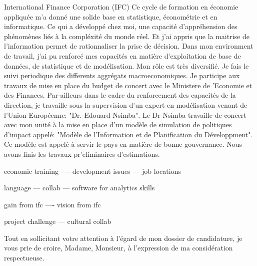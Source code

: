 \documentclass[12pt]{lettre}
\begin{document}
\begin{letter}{
International Finance Corporation (IFC)
}
Ce cycle de formation en \'{e}conomie appliqu\'{e}e m'a donn\'{e} une solide
base en statistique, \'{e}conom\'{e}trie et en informatique. 
Ce qui a d\'{e}velopp\'{e} chez moi, une capacit\'{e} d'appr\'{e}hension 
des ph\'{e}nom\`{e}nes li\'{e}s \`{a} la compl\'{e}xit\'{e} du monde r\'{e}el.
Et j'ai appris que la maitrise de l'information permet de rationnaliser la prise de d\'{e}cision. 
Dans mon environment de travail, j'ai pu renforc\'{e} mes capacit\'{e}s 
en mati\`{e}re d'exploitation de base de donn\'{e}es, de statistique 
et de mod\'{e}lisation. Mon r\^{o}le est tr\`{e}s diversifi\'{e}. Je fais le suivi
periodique des differents aggr\'{e}gats macroeconomiques. Je participe aux travaux de
mise en place du budget de concert avec le Ministere de 'Economie et des Finances. 
Par-ailleurs dans le cadre du renforcement des capacit\'{e}s de la direction, 
je travaille sous la supervision d'un expert en mod\'{e}lisation
venant de l'Union Europ\'{e}enne: "Dr. Edouard Nsimba". 
Le Dr Nsimba travaille de concert avec mon unit\'{e} \`{a} 
la mise en place d'un mod\`{e}le de simulation de politiques d'impact 
appel\'{e}: "Mod\`{e}le de l'Information et de Planification du D\'{e}veloppment".
Ce mod\`{e}le est appel\'{e} \`{a} servir le pays en mati\`{e}re de bonne gouvernance. 
Nous avons finis les travaux pr'{e}liminaires d'estimations.


economic training ---- development issues --- job locations

language --- collab --- software for analytics skills

gain from ifc ---- vision from ifc

project challenge --- cultural collab







\closing{Tout en  sollicitant votre attention \`{a} l'\'{e}gard de mon dossier de candidature, je vous prie de croire, Madame, Monsieur, \`{a} l'expression de ma consid\'{e}ration respectueuse.}
\end{letter}
\end{document}
